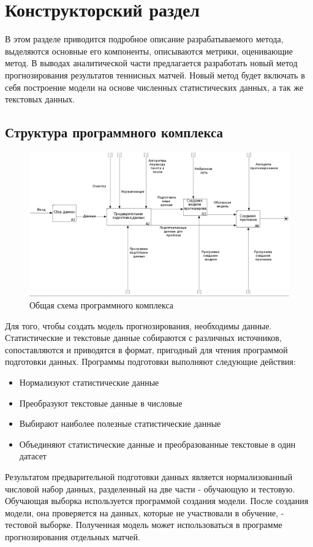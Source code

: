 \chapter{Конструкторский раздел}
В этом разделе приводится подробное описание разрабатываемого метода, выделяются основные его компоненты, описываются метрики, оценивающие метод. 
В выводах аналитической части предлагается разработать новый метод прогнозирования результатов теннисных матчей. Новый метод будет включать в себя построение модели на основе численных статистических данных, а так же текстовых данных.

\section{Структура программного комплекса}
\begin{figure}[!h]
	\centering
	\includegraphics[width=.9\textwidth]{diagrams/img/main_img_cut.png}
	\caption{Общая схема программного комплекса}
	\label{fig08}
\end{figure}
Для того, чтобы создать модель прогнозирования, необходимы данные. Статистические и текстовые данные собираются с различных источников, сопоставляются и приводятся в формат, пригодный для чтения программой подготовки данных. Программы подготовки выполняют следующие действия:
\begin{itemize}
	\item Нормализуют статистические данные
	\item Преобразуют текстовые данные в числовые
	\item Выбирают наиболее полезные статистические данные
	\item Объединяют статистические данные и преобразованные текстовые в один датасет
\end{itemize}
Результатом предварительной подготовки данных является нормализованный числовой набор данных, разделенный на две части - обучающую и тестовую.
Обучающая выборка используется программой создания модели.
После создания модели, она проверяется на данных, которые не участвовали в обучение, - тестовой выборке.
Полученная модель может использоваться в программе прогнозирования отдельных матчей.
